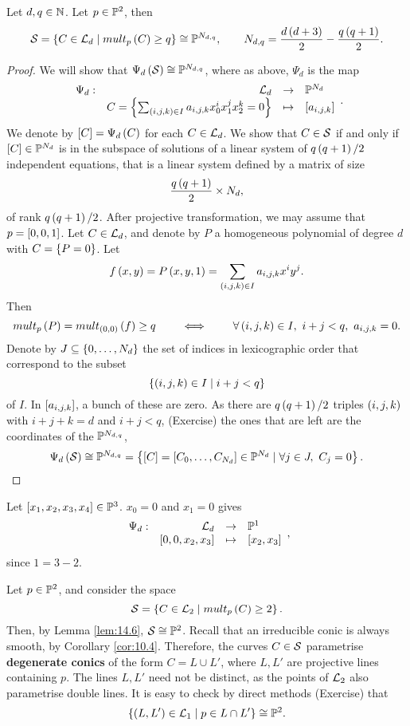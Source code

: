 \begin{lemma}
\label{lem:14.6}
Let $ d, q \in \N $. Let $ p \in \P^2 $, then
$$ \SS = \cb{C \in \LL_d \mid mult_p\rb{C} \ge q} \cong \P^{N_{d, q}}, \qquad N_{d, q} = \dfrac{d\rb{d + 3}}{2} - \dfrac{q\rb{q + 1}}{2}. $$
\end{lemma}

\begin{proof}
We will show that $ \Psi_d\rb{\SS} \cong \P^{N_{d, q}} $, where as above, $ \Psi_d $ is the map
$$ \function[\Psi_d]{\LL_d}{\P^{N_d}}{C = \cb{\sum_{\rb{i, j, k} \in I} a_{i, j, k}x_0^ix_1^jx_2^k = 0}}{\sb{a_{i, j, k}}}. $$
We denote by $ \sb{C} = \Psi_d\rb{C} $ for each $ C \in \LL_d $. We show that $ C \in \SS $ if and only if $ \sb{C} \in \P^{N_d} $ is in the subspace of solutions of a linear system of $ q\rb{q + 1} / 2 $ independent equations, that is a linear system defined by a matrix of size
$$ \dfrac{q\rb{q + 1}}{2} \times N_d, $$
of rank $ q\rb{q + 1} / 2 $. After projective transformation, we may assume that $ p = \sb{0, 0, 1} $. Let $ C \in \LL_d $, and denote by $ P $ a homogeneous polynomial of degree $ d $ with $ C = \cb{P = 0} $. Let
$$ f\rb{x, y} = P\rb{x, y, 1} =  \sum_{\rb{i, j, k} \in I} a_{i, j, k}x^iy^j. $$
Then
$$ mult_p\rb{P} = mult_{\rb{0, 0}}\rb{f} \ge q \qquad \iff \qquad \forall \rb{i, j, k} \in I, \ i + j < q, \ a_{i, j, k} = 0. $$
Denote by $ J \subseteq \cb{0, \dots, N_d} $ the set of indices in lexicographic order that correspond to the subset
$$ \cb{\rb{i, j, k} \in I \mid i + j < q} $$
of $ I $. In $ \sb{a_{i, j, k}} $, a bunch of these are zero. As there are $ q\rb{q + 1} / 2 $ triples $ \rb{i, j, k} $ with $ i + j + k = d $ and $ i + j < q $, (Exercise) the ones that are left are the coordinates of the $ \P^{N_{d, q}} $,
$$ \Psi_d\rb{\SS} \cong \P^{N_{d, q}} = \cb{\sb{C} = \sb{C_0, \dots, C_{N_d}} \in \P^{N_d} \mid \forall j \in J, \ C_j = 0}. $$
\end{proof}

\begin{example*}
Let $ \sb{x_1, x_2, x_3, x_4} \in \P^3 $. $ x_0 = 0 $ and $ x_1 = 0 $ gives
$$ \function[\Psi_d]{\LL_d}{\P^1}{\sb{0, 0, x_2, x_3}}{\sb{x_2, x_3}}, $$
since $ 1 = 3 - 2 $.
\end{example*}

\begin{example}
Let $ p \in \P^2 $, and consider the space
$$ \SS = \cb{C \in \LL_2 \mid mult_p\rb{C} \ge 2}. $$
Then, by Lemma \ref{lem:14.6}, $ \SS \cong \P^2 $. Recall that an irreducible conic is always smooth, by Corollary \ref{cor:10.4}. Therefore, the curves $ C \in \SS $ parametrise \textbf{degenerate conics} of the form $ C = L \cup L' $, where $ L, L' $ are projective lines containing $ p $. The lines $ L, L' $ need not be distinct, as the points of $ \LL_2 $ also parametrise double lines. It is easy to check by direct methods (Exercise) that
$$ \cb{\rb{L, L'} \in \LL_1 \mid p \in L \cap L'} \cong \P^2. $$
\end{example}

